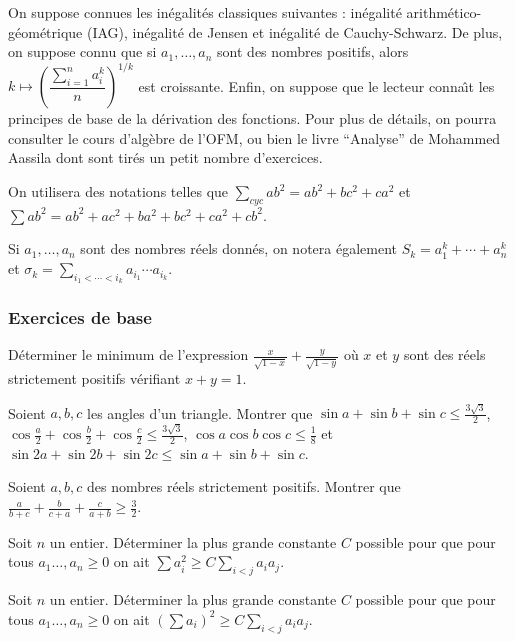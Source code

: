 On suppose connues les in\'egalit\'es classiques suivantes : in\'egalit\'e arithm\'etico-g\'eom\'etrique (IAG), in\'egalit\'e de Jensen
et in\'egalit\'e de Cauchy-Schwarz.
De plus, on suppose connu que si $a_1,\ldots,a_n$ sont des nombres positifs, alors $k\mapsto \left(\dfrac{\sum_{i=1}^n a_i^k}{n}\right)^{1/k}$ est croissante.
Enfin, on suppose que le lecteur conna\^{\i}t les principes de base de la d\'erivation des fonctions.
Pour plus de d\'etails, on pourra consulter le cours d'alg\`ebre de l'OFM, ou bien le livre
``Analyse'' de Mohammed Aassila dont sont tir\'es un petit nombre d'exercices.

On utilisera des notations telles que $\sum_{cyc}ab^2=ab^2+bc^2+ca^2$ et $\sum ab^2=ab^2+ac^2+ba^2+bc^2+ca^2+cb^2$.

Si $a_1,\ldots,a_n$ sont des nombres r\'eels donn\'es, on notera \'egalement $S_k=a_1^k+\cdots+a_n^k$ et $\sigma_k=\sum_{i_1<\cdots<i_k}a_{i_1}\cdots a_{i_k}$.

\subsubsection{Exercices de base}

\begin{exo}
 D\'eterminer le minimum de l'expression $\frac{x}{\sqrt{1-x}}+\frac{y}{\sqrt{1-y}}$ o\`u $x$ et $y$ sont des r\'eels strictement positifs v\'erifiant $x+y=1$.
\end{exo}

\begin{exo}
 Soient $a,b,c$ les angles d'un triangle. Montrer que $\sin a+\sin b+\sin c\leqslant \frac{3\sqrt{3}}{2}$, $\cos\frac{a}{2}+\cos\frac{b}{2}+\cos\frac{c}{2}\leqslant \frac{3\sqrt{3}}{2}$, $\cos a\cos b\cos c\leqslant \frac{1}{8}$ et $\sin 2a+\sin 2b+\sin 2c\leqslant \sin a +\sin b+\sin c$.
\end{exo}

\begin{exo}
 Soient $a,b,c$ des nombres r\'eels strictement positifs. Montrer que $\frac{a}{b+c}+\frac{b}{c+a}+\frac{c}{a+b}\geqslant \frac{3}{2}$.
\end{exo}

\begin{exo}
Soit $n$ un entier. D\'eterminer la plus grande constante $C$ possible pour que pour tous $a_1\ldots,a_n\geqslant 0$ on ait $\sum a_i^2\geqslant C\sum_{i<j}a_ia_j$. 
\end{exo}


\begin{exo}
Soit $n$ un entier. D\'eterminer la plus grande constante $C$ possible pour que pour tous $a_1\ldots,a_n\geqslant 0$ on ait $(\sum a_i)^2\geqslant C\sum_{i<j}a_ia_j$. 
\end{exo}

